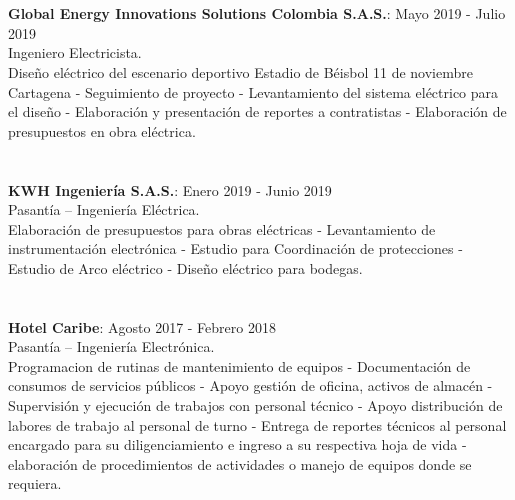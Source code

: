 \documentclass[margin]{res}
\begin{document}
\begin{resume}
\section{\centering}
\hfill \break
\textbf{Global Energy Innovations Solutions Colombia S.A.S.}: \hfill Mayo 2019 - Julio 2019
\\ Ingeniero Electricista.
\\Diseño eléctrico del escenario deportivo Estadio de Béisbol 11 de noviembre Cartagena - Seguimiento de proyecto - Levantamiento del sistema eléctrico para el diseño - Elaboración y presentación de reportes a contratistas - Elaboración de presupuestos en obra eléctrica.

\section{\centering}
\hfill \break
\textbf{KWH Ingeniería S.A.S.}: \hfill Enero 2019 - Junio 2019
\\Pasantía – Ingeniería Eléctrica.
\\Elaboración de presupuestos para obras eléctricas - Levantamiento de instrumentación electrónica - Estudio para Coordinación de protecciones - Estudio de Arco eléctrico - Diseño eléctrico para bodegas. 

\section{\centering}
\hfill \break
\textbf{Hotel Caribe}: \hfill Agosto 2017 - Febrero 2018
\\Pasantía – Ingeniería Electrónica.
\\Programacion de rutinas de mantenimiento de equipos - Documentación de consumos de servicios públicos - Apoyo gestión de oficina, activos de almacén - Supervisión y ejecución de trabajos con personal técnico - Apoyo distribución de labores de trabajo al personal de turno - Entrega de reportes técnicos al personal encargado para su diligenciamiento e ingreso a su respectiva hoja de vida - elaboración de procedimientos de actividades o manejo de equipos donde se requiera. 


\end{resume}
\end{document}
